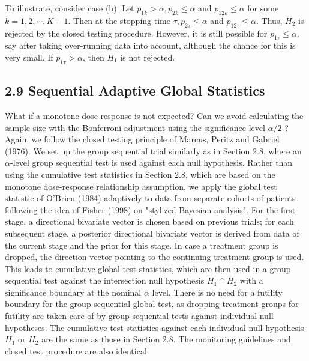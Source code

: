 \documentclass[10pt]{article}
\begin{document}
To illustrate, consider case (b). Let $p_{1 k}>\alpha, p_{2 k} \leq \alpha$ and $p_{12 k} \leq \alpha$ for some $k=1,2, \cdots, K-1$. Then at the stopping time $\tau, p_{2 \tau} \leq \alpha$ and $p_{12 \tau} \leq \alpha$. Thus, $H_{2}$ is rejected by the closed testing procedure. However, it is still possible for $p_{1 \tau} \leq \alpha$, say after taking over-running data into account, although the chance for this is very small. If $p_{1 \tau}>\alpha$, then $H_{1}$ is not rejected.

\subsection*{2.9 Sequential Adaptive Global Statistics}
What if a monotone dose-response is not expected? Can we avoid calculating the sample size with the Bonferroni adjustment using the significance level $\alpha / 2$ ? Again, we follow the closed testing principle of Marcus, Peritz and Gabriel (1976). We set up the group sequential trial similarly as in Section 2.8, where an $\alpha$-level group sequential test is used against each null hypothesis. Rather than using the cumulative test statistics in Section 2.8, which are based on the monotone dose-response relationship assumption, we apply the global test statistic of O'Brien (1984) adaptively to data from separate cohorts of patients following the idea of Fisher (1998) on "stylized Bayesian analysis". For the first stage, a directional bivariate vector is chosen based on previous trials; for each subsequent stage, a posterior directional bivariate vector is derived from data of the current stage and the prior for this stage. In case a treatment group is dropped, the direction vector pointing to the continuing treatment group is used. This leads to cumulative global test statistics, which are then used in a group sequential test against the intersection null hypothesis $H_{1} \cap H_{2}$ with a significance boundary at the nominal $\alpha$ level. There is no need for a futility boundary for the group sequential global test, as dropping treatment groups for futility are taken care of by group sequential tests against individual null hypotheses. The cumulative test statistics against each individual null hypothesis $H_{1}$ or $H_{2}$ are the same as those in Section 2.8. The monitoring guidelines and closed test procedure are also identical.
\end{document}
